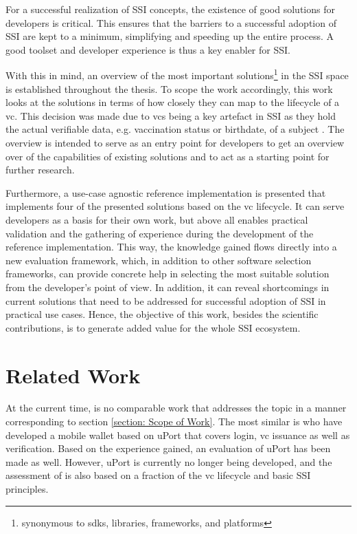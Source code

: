 	For a successful realization of \ac{SSI} concepts, the existence of good solutions for developers is critical. This ensures that the barriers to a successful adoption of \ac{SSI} are kept to a minimum, simplifying and speeding up the entire process. A good toolset and developer experience is thus a key enabler for \ac{SSI}.
	
	With this in mind, an overview of the most important solutions\footnote{synonymous to \acp{sdk}, libraries, frameworks, and platforms} in the \ac{SSI} space is established throughout the thesis. To scope the work accordingly, this work looks at the solutions in terms of how closely they can map to the lifecycle of a \acf{vc}. This decision was made due to \acsp{vc} being a key artefact in \ac{SSI} as they hold the actual verifiable data, e.g. vaccination status or birthdate, of a subject \cite{sporny_verifiable_2019}. The overview is intended to serve as an entry point for developers to get an overview over of the capabilities of existing solutions and to act as a starting point for further research. 
	
	Furthermore, a use-case agnostic reference implementation is presented that implements four of the presented solutions based on the \ac{vc} lifecycle. It can serve developers as a basis for their own work, but above all enables practical validation and the gathering of experience during the development of the reference implementation. This way, the knowledge gained flows directly into a new evaluation framework, which, in addition to other software selection frameworks, can provide concrete help in selecting the most suitable solution from the developer's point of view. In addition, it can reveal shortcomings in current solutions that need to be addressed for successful adoption of \ac{SSI} in practical use cases. Hence, the objective of this work, besides the scientific contributions, is to generate added value for the whole \ac{SSI} ecosystem.
	
	\section{Related Work} %
	
	At the current time, is no comparable work that addresses the topic in a manner corresponding to section \ref{section: Scope of Work}. The most similar is \cite{naik_uport_2020} who have developed a mobile wallet based on uPort that covers login, \ac{vc} issuance as well as verification. Based on the experience gained, an evaluation of uPort has been made as well. However, uPort is currently no longer being developed, and the assessment of \cite{naik_uport_2020} is also based on a fraction of the \acs{vc} lifecycle and basic \ac{SSI} principles.
	

